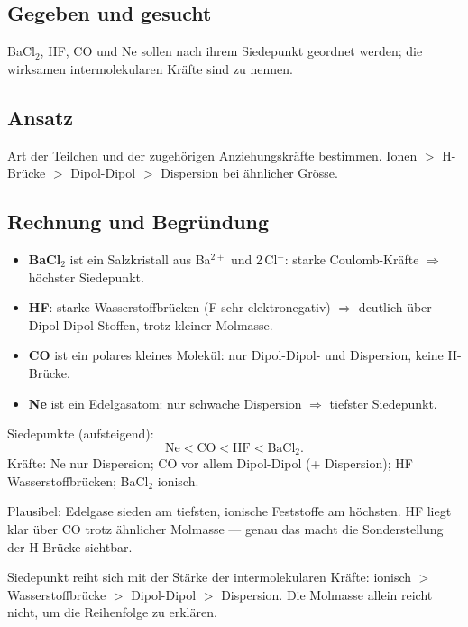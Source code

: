 
\subsection*{Gegeben und gesucht}
BaCl$_2$, HF, CO und Ne sollen nach ihrem Siedepunkt geordnet werden; die
wirksamen intermolekularen Kräfte sind zu nennen.

\subsection*{Ansatz}
Art der Teilchen und der zugehörigen Anziehungskräfte bestimmen. Ionen
$>$ H-Brücke $>$ Dipol-Dipol $>$ Dispersion bei ähnlicher Grösse.

\subsection*{Rechnung und Begründung}
\begin{itemize}
  \item \textbf{BaCl$_2$} ist ein Salzkristall aus Ba$^{2+}$ und 2\,Cl$^-$:
        starke Coulomb-Kräfte $\Rightarrow$ höchster Siedepunkt.
  \item \textbf{HF}: starke Wasserstoffbrücken (F sehr elektronegativ)
        $\Rightarrow$ deutlich über Dipol-Dipol-Stoffen, trotz kleiner Molmasse.
  \item \textbf{CO} ist ein polares kleines Molekül: nur Dipol-Dipol- und
        Dispersion, keine H-Brücke.
  \item \textbf{Ne} ist ein Edelgasatom: nur schwache Dispersion
        $\Rightarrow$ tiefster Siedepunkt.
\end{itemize}

\begin{ergebnis}
Siedepunkte (aufsteigend):
\[
  \text{Ne} < \text{CO} < \text{HF} < \text{BaCl}_2 .
\]
Kräfte: Ne nur Dispersion; CO vor allem Dipol-Dipol (+ Dispersion); HF
Wasserstoffbrücken; BaCl$_2$ ionisch.
\end{ergebnis}

\begin{kontrolle}
Plausibel: Edelgase sieden am tiefsten, ionische Feststoffe am höchsten.
HF liegt klar über CO trotz ähnlicher Molmasse --- genau das macht die
Sonderstellung der H-Brücke sichtbar.
\end{kontrolle}

\begin{merksatz}
Siedepunkt reiht sich mit der Stärke der intermolekularen Kräfte: ionisch
$>$ Wasserstoffbrücke $>$ Dipol-Dipol $>$ Dispersion. Die Molmasse allein
reicht nicht, um die Reihenfolge zu erklären.
\end{merksatz}
